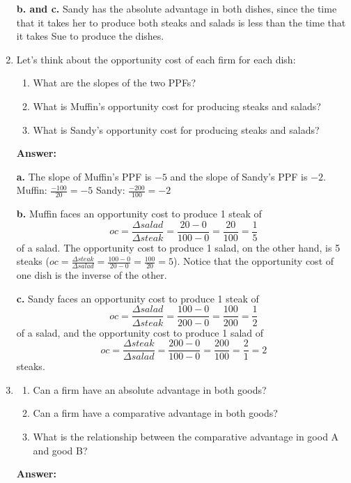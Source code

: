 \documentclass[12pt]{article}
\begin{document}
\begin{enumerate}
\textbf{b. and c.} Sandy has the absolute advantage in both dishes, since the time that it takes her to produce both steaks and salads is less than the time that it takes Sue to produce the dishes. 

\newpage

\item Let's think about the opportunity cost of each firm for each dish:
\begin{enumerate}
    \item What are the slopes of the two PPFs?
    \item What is Muffin's opportunity cost for producing steaks and salads?
    \item What is Sandy's opportunity cost for producing steaks and salads?
\end{enumerate}

\textbf{Answer:}

\textbf{a.} The slope of Muffin's PPF is $-5$ and the slope of Sandy's PPF is $-2$.
Muffin: \(\frac{-100}{20} = -5\)
Sandy: \(\frac{-200}{100} = -2\)

\textbf{b.} Muffin faces an opportunity cost to produce 1 steak of \[oc = \frac{\Delta salad}{\Delta steak } = \frac{20-0}{100-0} = \frac{20}{100} = \frac{1}{5}\] of a salad. The opportunity cost to produce 1 salad, on the other hand, is 5 steaks (\(oc = \frac{\Delta steak}{\Delta salad } = \frac{100-0}{20-0} = \frac{100}{20} = 5\)). Notice that the opportunity cost of one dish is the inverse of the other. 

\textbf{c.} Sandy faces an opportunity cost to produce 1 steak of \[oc = \frac{\Delta salad}{\Delta steak } = \frac{100-0}{200-0} = \frac{100}{200} =\frac{1}{2}\] of a salad, and the opportunity cost to produce 1 salad of \[oc = \frac{\Delta steak}{\Delta salad} = \frac{200-0}{100-0} = \frac{200}{100} =\frac{2}{1} = 2\] steaks.

\medskip
\medskip
\medskip

\item 
\begin{enumerate}
    \item Can a firm have an absolute advantage in both goods?
    \item Can a firm have a comparative advantage in both goods?
    \item What is the relationship between the comparative advantage in good A and good B?
\end{enumerate}

\textbf{Answer:}


\end{enumerate}
\end{document}
